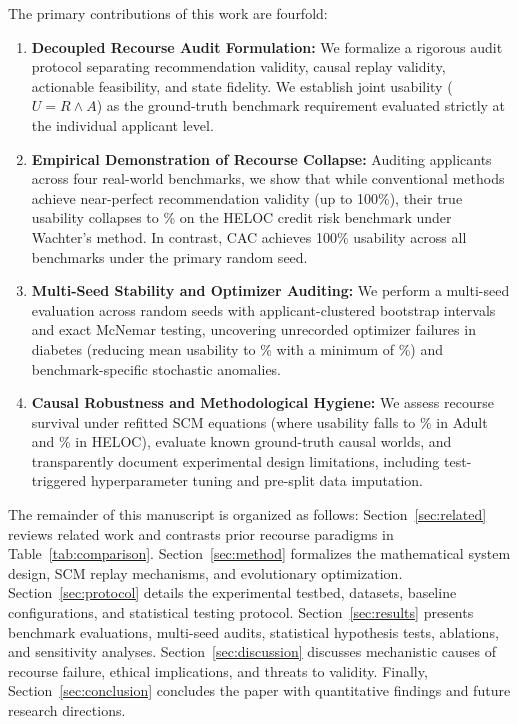 \documentclass[nolineno]{paper/ieee-access/ieeeaccess}%
\newcommand{\CAC}{CAC}
\begin{document}
The primary contributions of this work are fourfold:
\begin{enumerate}
\item \textbf{Decoupled Recourse Audit Formulation:} We formalize a rigorous audit protocol separating recommendation validity, causal replay validity, actionable feasibility, and state fidelity. We establish joint usability ($U=R \land A$) as the ground-truth benchmark requirement evaluated strictly at the individual applicant level.
\item \textbf{Empirical Demonstration of Recourse Collapse:} Auditing \TotalApplicants{} applicants across four real-world benchmarks, we show that while conventional methods achieve near-perfect recommendation validity (up to 100\%), their true usability collapses to \HelocWachterUsable\% on the HELOC credit risk benchmark under Wachter's method. In contrast, \CAC{} achieves 100\% usability across all benchmarks under the primary random seed.
\item \textbf{Multi-Seed Stability and Optimizer Auditing:} We perform a multi-seed evaluation across \CacSeeds{} random seeds with applicant-clustered bootstrap intervals and exact McNemar testing, uncovering unrecorded optimizer failures in diabetes (reducing mean usability to \DiabetesCacSeedMean\% with a minimum of \DiabetesCacSeedMin\%) and benchmark-specific stochastic anomalies.
\item \textbf{Causal Robustness and Methodological Hygiene:} We assess recourse survival under refitted SCM equations (where usability falls to \AdultRefitUsable\% in Adult and \HelocRefitUsable\% in HELOC), evaluate known ground-truth causal worlds, and transparently document experimental design limitations, including test-triggered hyperparameter tuning and pre-split data imputation.
\end{enumerate}

The remainder of this manuscript is organized as follows: Section~\ref{sec:related} reviews related work and contrasts prior recourse paradigms in Table~\ref{tab:comparison}. Section~\ref{sec:method} formalizes the mathematical system design, SCM replay mechanisms, and evolutionary optimization. Section~\ref{sec:protocol} details the experimental testbed, datasets, baseline configurations, and statistical testing protocol. Section~\ref{sec:results} presents benchmark evaluations, multi-seed audits, statistical hypothesis tests, ablations, and sensitivity analyses. Section~\ref{sec:discussion} discusses mechanistic causes of recourse failure, ethical implications, and threats to validity. Finally, Section~\ref{sec:conclusion} concludes the paper with quantitative findings and future research directions.
\end{document}
